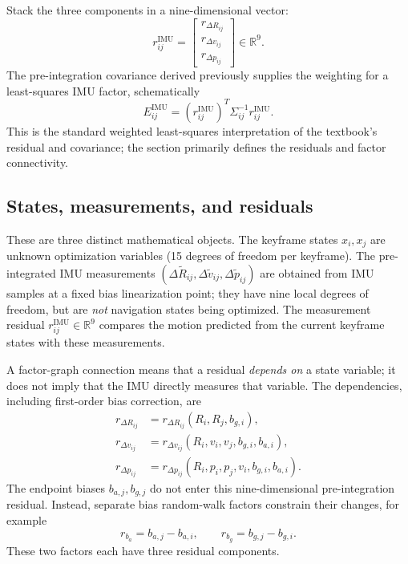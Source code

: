 \documentclass[11pt,a4paper]{article}
\begin{document}
Stack the three components in a nine-dimensional vector:
\begin{equation}
\boxed{r_{ij}^{\mathrm{IMU}}=
\begin{bmatrix}
 r_{\Delta R_{ij}}\\ r_{\Delta v_{ij}}\\ r_{\Delta p_{ij}}
\end{bmatrix}\in\mathbb R^9.}
\end{equation}
The pre-integration covariance derived previously supplies the
weighting for a least-squares IMU factor, schematically
\begin{equation}
 E_{ij}^{\mathrm{IMU}}
 =\left(r_{ij}^{\mathrm{IMU}}\right)^T
 \Sigma_{ij}^{-1}r_{ij}^{\mathrm{IMU}}.
\end{equation}
This is the standard weighted least-squares interpretation of the
textbook's residual and covariance; the section primarily defines
the residuals and factor connectivity.


\subsection{States, measurements, and residuals}
These are three distinct mathematical objects. The keyframe states
$x_i,x_j$ are unknown optimization variables (15 degrees of freedom
per keyframe). The pre-integrated IMU measurements
$(\Delta\tilde R_{ij},\Delta\tilde v_{ij},\Delta\tilde p_{ij})$
are obtained from IMU samples at a fixed bias linearization point;
they have nine local degrees of freedom, but are \emph{not} navigation
states being optimized. The measurement residual
$r_{ij}^{\mathrm{IMU}}\in\mathbb R^9$ compares the motion predicted
from the current keyframe states with these measurements.

A factor-graph connection means that a residual \emph{depends on}
a state variable; it does not imply that the IMU directly measures
that variable. The dependencies, including first-order bias
correction, are
\begin{align*}
 r_{\Delta R_{ij}}&=r_{\Delta R_{ij}}(R_i,R_j,b_{g,i}),\\
 r_{\Delta v_{ij}}&=r_{\Delta v_{ij}}(R_i,v_i,v_j,b_{g,i},b_{a,i}),\\
 r_{\Delta p_{ij}}&=r_{\Delta p_{ij}}(R_i,p_i,p_j,v_i,b_{g,i},b_{a,i}).
\end{align*}
The endpoint biases $b_{a,j},b_{g,j}$ do not enter this nine-dimensional
pre-integration residual. Instead, separate bias random-walk factors
constrain their changes, for example
\begin{equation}
 r_{b_a}=b_{a,j}-b_{a,i},\qquad
 r_{b_g}=b_{g,j}-b_{g,i}.
\end{equation}
These two factors each have three residual components.
\end{document}
